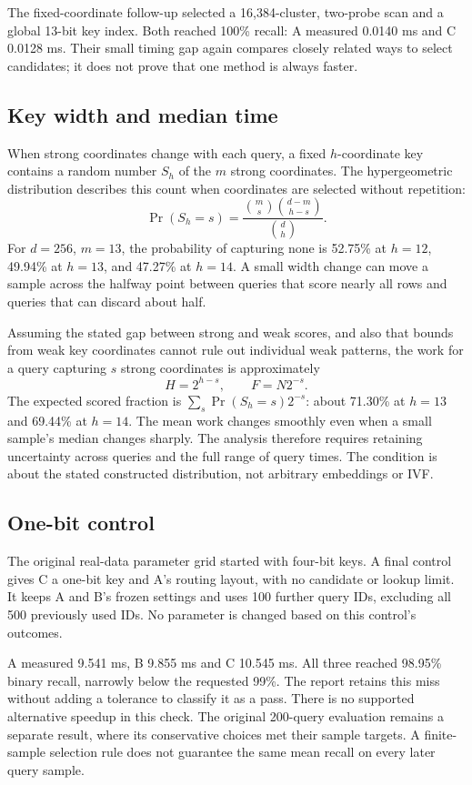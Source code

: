 The fixed-coordinate follow-up selected a 16,384-cluster, two-probe scan and a global 13-bit
key index. Both reached 100\% recall: A measured 0.0140 ms and C 0.0128 ms. Their small timing gap again compares closely related ways to select candidates; it does
not prove that one method is always faster.

\subsection{Key width and median time}
When strong coordinates change with each query, a fixed $h$-coordinate key contains a random
number $S_h$ of the $m$ strong coordinates. The hypergeometric distribution describes this
count when coordinates are selected without repetition:
\begin{equation}
\Pr(S_h=s)=\frac{\binom ms\binom{d-m}{h-s}}{\binom dh}.
\label{eq:captured-strong}
\end{equation}
For $d=256$, $m=13$, the probability of capturing none is 52.75\% at $h=12$, 49.94\% at $h=13$,
and 47.27\% at $h=14$. A small width change can move a sample across the halfway point between
queries that score nearly all rows and queries that can discard about half.

Assuming the stated gap between strong and weak scores, and also that bounds from weak key
coordinates cannot rule out individual weak patterns, the work for a query capturing $s$ strong coordinates is approximately
\[
H=2^{h-s},\qquad F=N2^{-s}.
\]
The expected scored fraction is $\sum_s\Pr(S_h=s)2^{-s}$: about 71.30\% at $h=13$ and 69.44\%
at $h=14$. The mean work changes smoothly even when a small sample's median changes sharply.
The analysis therefore requires retaining uncertainty across queries and the full range of query times.
The condition is about the stated constructed distribution, not arbitrary embeddings or IVF.

\subsection{One-bit control}
The original real-data parameter grid started with four-bit keys. A final control gives C a one-bit key and
A's routing layout, with no candidate or lookup limit. It keeps A and B's frozen settings and
uses 100 further query IDs, excluding all 500 previously used IDs. No parameter is changed
based on this control's outcomes.

A measured 9.541 ms, B 9.855 ms and C 10.545 ms. All three reached 98.95\% binary recall,
narrowly below the requested 99\%. The report retains this miss without adding a tolerance
to classify it as a pass. There is no supported alternative speedup in this check. The original 200-query
evaluation remains a separate result, where its conservative choices met their sample targets.
A finite-sample selection rule does not guarantee the same mean recall on every later query sample.


